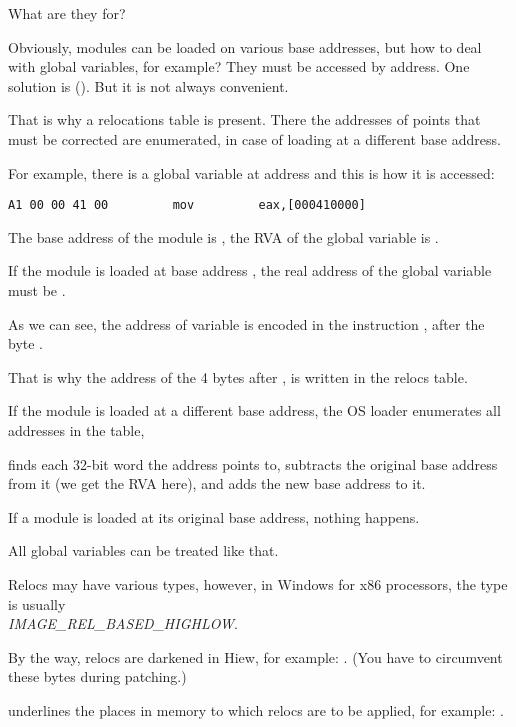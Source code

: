 What are they for?

Obviously, modules can be loaded on various base addresses, but how to deal with global variables, for example?
They must be accessed by address.  One solution is \PICcode{} ().
But it is not always convenient.

That is why a relocations table is present.
There the addresses of points that must be corrected are enumerated,
in case of loading at a different base address.

For example, there is a global variable at address  and this is how it is accessed:

\begin{lstlisting}[style=customasmx86]
A1 00 00 41 00         mov         eax,[000410000]
\end{lstlisting}

The base address of the module is , the \ac{RVA} of the global variable is .

If the module is loaded at base address , the real address of the global variable must be .


As we can see, the address of variable is encoded in the instruction , after the byte .

That is why the address of the 4 bytes after , is written in the relocs table.

If the module is loaded at a different base address, the \ac{OS} loader enumerates all addresses in the table,

finds each 32-bit word the address points to, subtracts the original base address from it
(we get the \ac{RVA} here), and adds the new base address to it.

If a module is loaded at its original base address, nothing happens.

All global variables can be treated like that.

Relocs may have various types, however, in Windows for x86 processors, the type is usually \\
\emph{IMAGE\_REL\_BASED\_HIGHLOW}.

By the way, relocs are darkened in Hiew, for example: .
(You have to circumvent these bytes during patching.)

\myindex{\olly}
\olly underlines the places in memory to which relocs are to be applied, for example: .

